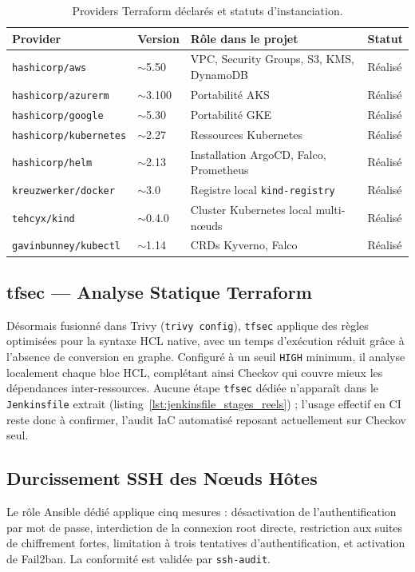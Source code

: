 \begin{table}[H]
\centering
\scriptsize
\begin{tabular}{@{}p{3cm}p{2.5cm}p{5.5cm}p{2cm}@{}}
\toprule
\textbf{Provider} & \textbf{Version} & \textbf{Rôle dans le projet} & \textbf{Statut} \\
\midrule
\texttt{hashicorp/aws} & $\sim$5.50 & VPC, Security Groups, S3, KMS, DynamoDB & Réalisé \\
\texttt{hashicorp/azurerm} & $\sim$3.100 & Portabilité AKS & Réalisé \\
\texttt{hashicorp/google} & $\sim$5.30 & Portabilité GKE & Réalisé \\
\texttt{hashicorp/kubernetes} & $\sim$2.27 & Ressources Kubernetes & Réalisé \\
\texttt{hashicorp/helm} & $\sim$2.13 & Installation ArgoCD, Falco, Prometheus & Réalisé \\
\texttt{kreuzwerker/docker} & $\sim$3.0 & Registre local \texttt{kind-registry} & Réalisé \\
\texttt{tehcyx/kind} & $\sim$0.4.0 & Cluster Kubernetes local multi-nœuds & Réalisé \\
\texttt{gavinbunney/kubectl} & $\sim$1.14 & CRDs Kyverno, Falco & Réalisé \\
\bottomrule
\end{tabular}
\caption{Providers Terraform déclarés et statuts d'instanciation.}
\label{tab:terraform_providers}
\end{table}

\subsection{tfsec — Analyse Statique Terraform}
Désormais fusionné dans Trivy (\texttt{trivy config}), \texttt{tfsec} applique des règles optimisées pour la syntaxe HCL native, avec un temps d'exécution réduit grâce à l'absence de conversion en graphe. Configuré à un seuil \texttt{HIGH} minimum, il analyse localement chaque bloc HCL, complétant ainsi Checkov qui couvre mieux les dépendances inter-ressources. Aucune étape \texttt{tfsec} dédiée n'apparaît dans le \texttt{Jenkinsfile} extrait (listing~\ref{lst:jenkinsfile_stages_reels}) ; l'usage effectif en CI reste donc à confirmer, l'audit IaC automatisé reposant actuellement sur Checkov seul.

\subsection{Durcissement SSH des Nœuds Hôtes}
Le rôle Ansible dédié applique cinq mesures : désactivation de l'authentification par mot de passe, interdiction de la connexion root directe, restriction aux suites de chiffrement fortes, limitation à trois tentatives d'authentification, et activation de Fail2ban. La conformité est validée par \texttt{ssh-audit}.

